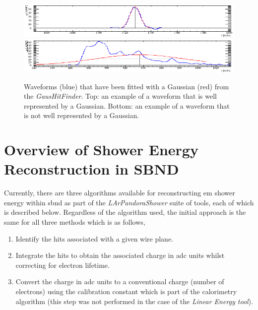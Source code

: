 \begin{figure}[h!]
    \centering
    \includegraphics[width = \largefigwidth]{figures-chap4/good_gauss_fit.png}
    \includegraphics[width = \largefigwidth]{figures-chap4/bad_gauss_fit.png}
    \caption[Example of a well and poorly fitted waveform.]{Waveforms (blue) that have been fitted with a Gaussian (red) from the \textit{GausHitFinder}. Top: an example of a waveform that is well represented by a Gaussian. Bottom: an example of a waveform that is not well represented by a Gaussian.}
    \label{fig:fitted_waveforms}
\end{figure}

\section{Overview of Shower Energy Reconstruction in SBND}\label{subchap:shower reco overview}

Currently, there are three algorithms available for reconstructing \gls{em} shower energy within \gls{sbnd} as part of the \textit{LArPandoraShower} suite of tools, each of which is described below. Regardless of the algorithm used, the initial approach is the same for all three methods which is as follows,
\begin{enumerate}
    \item Identify the hits associated with a given wire plane.
    \item Integrate the hits to obtain the associated charge in \gls{adc} units whilst correcting for electron lifetime. 
    \item Convert the charge in \gls{adc} units to a conventional charge (number of electrons) using the calibration constant which is part of the calorimetry algorithm (this step was not performed in the case of the \textit{Linear Energy tool}). 
\end{enumerate}

